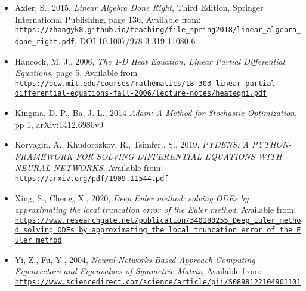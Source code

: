 \documentclass[12pt,a4paper]{article}
\begin{document}
\begin{itemize}
	\item Axler, S., 2015, \emph{Linear Algebra Done Right}, Third Edition, Springer International Publishing, page 136, Available from: \href{{https://zhangyk8.github.io/teaching/file_spring2018/linear_algebra_done_right.pdf}}{\nolinkurl{https://zhangyk8.github.io/teaching/file_spring2018/linear_algebra_done_right.pdf}}, DOI 10.1007/978-3-319-11080-6
  \item Hancock, M. J., 2006, \emph{The 1-D Heat Equation, Linear Partial Differential Equations}, page 5, Available from \href{{https://ocw.mit.edu/courses/mathematics/18-303-linear-partial-differential-equations-fall-2006/lecture-notes/heateqni.pdf}}{\nolinkurl{https://ocw.mit.edu/courses/mathematics/18-303-linear-partial-differential-equations-fall-2006/lecture-notes/heateqni.pdf}}
  \item Kingma, D. P., Ba, J. L., 2014 \emph{Adam: A Method for Stochastic Optimization}, pp 1, arXiv:1412.6980v9
  \item Koryagin, A., Khudorozkov, R., Tsimfer., S., 2019, \emph{PYDENS: A PYTHON-FRAMEWORK FOR SOLVING DIFFERENTIAL EQUATIONS WITH NEURAL NETWORKS}, Available from: \href{{https://arxiv.org/pdf/1909.11544.pdf}}{\nolinkurl{https://arxiv.org/pdf/1909.11544.pdf}}
  \item Xing, S., Cheng, X., 2020, \emph{Deep Euler method: solving ODEs by approximating the local truncation error of the Euler method}, Available from: \href{{https://www.researchgate.net/publication/340180255_Deep_Euler_method_solving_ODEs_by_approximating_the_local_truncation_error_of_the_Euler_method}}{\nolinkurl{https://www.researchgate.net/publication/340180255_Deep_Euler_method_solving_ODEs_by_approximating_the_local_truncation_error_of_the_Euler_method}}
  \item Yi, Z., Fu, Y., 2004, \emph{Neural Networks Based Approach Computing Eigenvectors and Eigenvalues of Symmetric Matrix}, Available from: \href{{https://www.sciencedirect.com/science/article/pii/S0898122104901101}}{\nolinkurl{https://www.sciencedirect.com/science/article/pii/S0898122104901101}}
\end{itemize}
\end{document}
